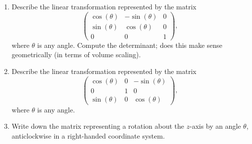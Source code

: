 \documentclass{article}
\begin{document}
\begin{enumerate}
	\item Describe the linear transformation represented by the matrix
		\[\left(\begin{array}{ccc}\cos(\theta) & -\sin(\theta)&0\\ \sin(\theta)&\cos(\theta)&0\\0&0&1\end{array}\right),\]
		where $\theta$ is any angle. Compute the determinant; does this make sense geometrically (in terms of volume scaling).
	\item Describe the linear transformation represented by the matrix
		\[\left(\begin{array}{ccc}\cos(\theta) &0& -\sin(\theta)\\0&1&0\\ \sin(\theta)&0&\cos(\theta)\end{array}\right),\]
		where $\theta$ is any angle.
	\item Write down the matrix representing a rotation about the $z$-axis by an angle $\theta$, anticlockwise in a right-handed coordinate system.
\end{enumerate}
\clearpage
\end{document}

